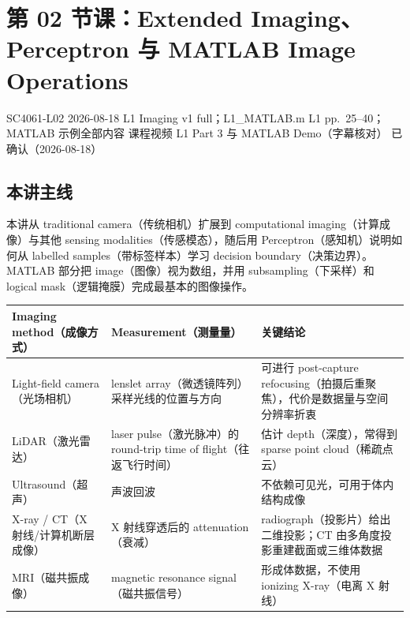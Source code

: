 
\section{第 02 节课：Extended Imaging、Perceptron 与 MATLAB Image Operations}
\label{lecture:SC4061-L02}

\lecturemeta
  {SC4061-L02}
  {2026-08-18}
  {L1 Imaging v1 full；L1\_MATLAB.m}
  {L1 pp.~25--40；MATLAB 示例全部内容}
  {课程视频 L1 Part 3 与 MATLAB Demo（字幕核对）}
  {已确认（2026-08-18）}

\subsection{本讲主线}

本讲从 traditional camera（传统相机）扩展到 computational imaging（计算成像）与其他 sensing modalities（传感模态），随后用 Perceptron（感知机）说明如何从 labelled samples（带标签样本）学习 decision boundary（决策边界）。MATLAB 部分把 image（图像）视为数组，并用 subsampling（下采样）和 logical mask（逻辑掩膜）完成最基本的图像操作。


\begin{center}
\small
\begin{tabularx}{\textwidth}{@{}>{\raggedright\arraybackslash}p{3.5cm}>{\raggedright\arraybackslash}p{4.2cm}>{\raggedright\arraybackslash}X@{}}
  \toprule
  Imaging method（成像方式） & Measurement（测量量） & 关键结论 \\
  \midrule
  Light-field camera（光场相机） & lenslet array（微透镜阵列）采样光线的位置与方向 & 可进行 post-capture refocusing（拍摄后重聚焦），代价是数据量与空间分辨率折衷 \\
  LiDAR（激光雷达） & laser pulse（激光脉冲）的 round-trip time of flight（往返飞行时间） & 估计 depth（深度），常得到 sparse point cloud（稀疏点云） \\
  Ultrasound（超声） & 声波回波 & 不依赖可见光，可用于体内结构成像 \\
  X-ray / CT（X 射线/计算机断层成像） & X 射线穿透后的 attenuation（衰减） & radiograph（投影片）给出二维投影；CT 由多角度投影重建截面或三维体数据 \\
  MRI（磁共振成像） & magnetic resonance signal（磁共振信号） & 形成体数据，不使用 ionizing X-ray（电离 X 射线） \\
  \bottomrule
\end{tabularx}
\end{center}

